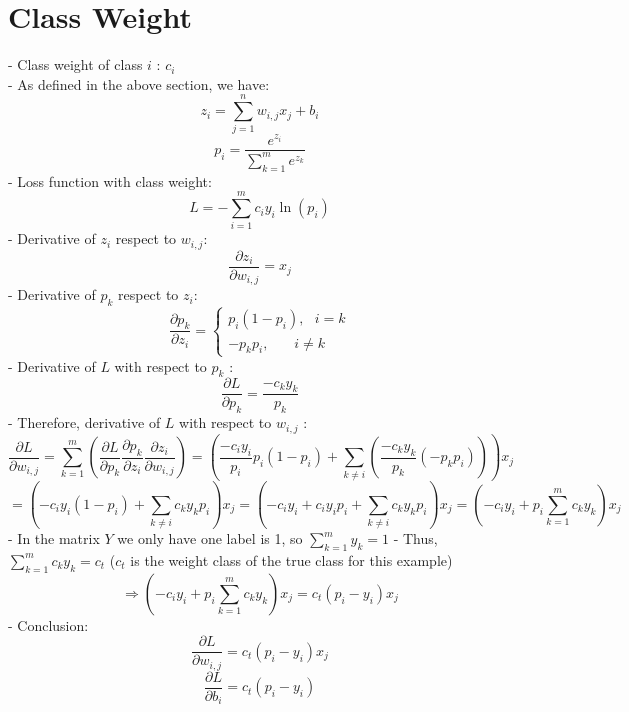 \documentclass{article}
\begin{document}
    \section*{Class Weight}
    - Class weight of class $i$ : $c_i$ \\
    - As defined in the above section, we have:
    \[
        z_i = \sum_{j = 1}^{n}w_{i, j}x_j + b_i
    \]
    \[
        p_i = \frac{e^{z_i}}{\sum_{k = 1}^{m}e^{z_k}}
    \]
    - Loss function with class weight:
    \[
        L = -\sum_{i = 1}^{m}c_iy_i\ln\left(p_i\right)
    \]
    - Derivative of $z_i$ respect to $w_{i, j}$:
    \[
        \frac{\partial z_i}{\partial w_{i, j}} = x_j
    \]
    - Derivative of $p_k$ respect to $z_i$:
    \[
        \frac{\partial p_k}{\partial z_i} = 
        \begin{cases}
            p_i(1-p_i), \ \ \ i = k \\
            -p_kp_i, \ \ \ \ \ \ \ \ i \neq  k
        \end{cases}
    \]
    - Derivative of $L$ with respect to $p_k$ :
    \[
        \frac{\partial L}{\partial p_k} = 
        \frac{-c_ky_k}{p_k}
    \]
    - Therefore, derivative of $L$ with respect to $w_{i, j}$ :
    \[
        \frac{\partial L}{\partial w_{i, j}} = 
        \sum_{k = 1}^{m}\left(
            \frac{\partial L}{\partial p_k}
            \frac{\partial p_k}{\partial z_i}
            \frac{\partial z_i}{\partial w_{i, j}}
        \right) =
        \left(
            \frac{-c_iy_i}{p_i}p_i(1-p_i) + 
            \sum_{k \neq i}\left(\frac{-c_ky_k}{p_k}(-p_kp_i)\right)
        \right) x_j
    \]
    \[
        = \left(
            -c_iy_i(1-p_i) + \sum_{k \neq i}c_ky_kp_i
        \right)x_j = 
        \left(
            -c_iy_i + c_iy_ip_i + \sum_{k \neq i}c_ky_kp_i
        \right)x_j = 
        \left(
            -c_iy_i + p_i\sum_{k = 1}^{m}c_ky_k
        \right)x_j
    \]
    - In the matrix $Y$ we only have one label is 1, so $\sum_{k = 1}^{m}y_k = 1$
    - Thus, $\sum_{k = 1}^{m}c_ky_k = c_t$
    ($c_t$ is the weight class of the true class for this example)
    \[
        \Rightarrow \left(
            -c_iy_i + p_i\sum_{k = 1}^{m}c_ky_k
        \right)x_j = c_t(p_i - y_i)x_j
    \]
    - Conclusion:
    \[
        \frac{\partial L}{\partial w_{i, j}} = c_t(p_i - y_i)x_j
    \]
    \[
        \frac{\partial L}{\partial b_i} = c_t(p_i - y_i)
    \]
\end{document}
